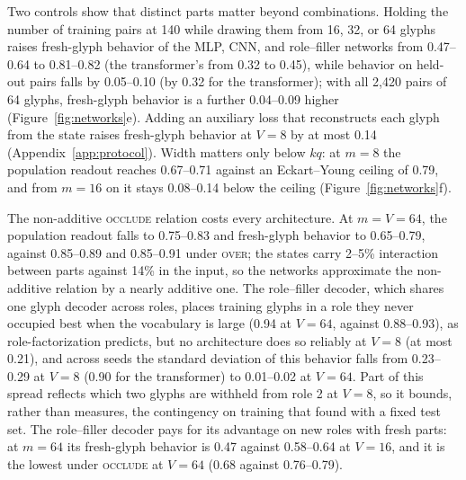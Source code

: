 \documentclass[10pt]{article}
\theoremstyle{plain}
\theoremstyle{remark}
\begin{document}
Two controls show that distinct parts matter beyond combinations. Holding the number of training pairs at 140 while drawing them from 16, 32, or 64 glyphs raises fresh-glyph behavior of the MLP, CNN, and role--filler networks from 0.47--0.64 to 0.81--0.82 (the transformer's from 0.32 to 0.45), while behavior on held-out pairs falls by 0.05--0.10 (by 0.32 for the transformer); with all 2{,}420 pairs of 64 glyphs, fresh-glyph behavior is a further 0.04--0.09 higher (Figure~\ref{fig:networks}e). Adding an auxiliary loss that reconstructs each glyph from the state raises fresh-glyph behavior at $V = 8$ by at most 0.14 (Appendix~\ref{app:protocol}). Width matters only below $kq$: at $m = 8$ the population readout reaches 0.67--0.71 against an Eckart--Young ceiling of 0.79, and from $m = 16$ on it stays 0.08--0.14 below the ceiling (Figure~\ref{fig:networks}f).

The non-additive \textsc{occlude} relation costs every architecture. At $m = V = 64$, the population readout falls to 0.75--0.83 and fresh-glyph behavior to 0.65--0.79, against 0.85--0.89 and 0.85--0.91 under \textsc{over}; the states carry 2--5\% interaction between parts against 14\% in the input, so the networks approximate the non-additive relation by a nearly additive one. The role--filler decoder, which shares one glyph decoder across roles, places training glyphs in a role they never occupied best when the vocabulary is large (0.94 at $V = 64$, against 0.88--0.93), as role-factorization predicts, but no architecture does so reliably at $V = 8$ (at most 0.21), and across seeds the standard deviation of this behavior falls from 0.23--0.29 at $V = 8$ (0.90 for the transformer) to 0.01--0.02 at $V = 64$. Part of this spread reflects which two glyphs are withheld from role 2 at $V = 8$, so it bounds, rather than measures, the contingency on training that \citet{mccoy2020berts} found with a fixed test set. The role--filler decoder pays for its advantage on new roles with fresh parts: at $m = 64$ its fresh-glyph behavior is 0.47 against 0.58--0.64 at $V = 16$, and it is the lowest under \textsc{occlude} at $V = 64$ (0.68 against 0.76--0.79).
\end{document}

